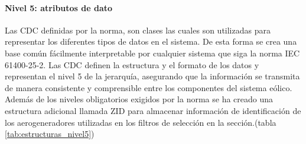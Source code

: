 \paragraph{Nivel 5: atributos de dato}
 Las \ac{CDC} definidas por la norma, son clases las cuales son utilizadas para representar los diferentes tipos de datos en el sistema. De esta forma se crea una base común fácilmente interpretable por cualquier sistema que siga la norma IEC 61400-25-2. Las \ac{CDC} definen la estructura y el formato de los datos y representan el nivel 5 de la jerarquía, asegurando que la información se transmita de manera consistente y comprensible entre los componentes del sistema eólico. Además de los niveles obligatorios exigidos por la norma se ha creado una estructura adicional llamada ZID para almacenar información de identificación de los aerogeneradores utilizadas en los filtros de selección en la sección.(tabla \ref{tab:estructuras_nivel5})

